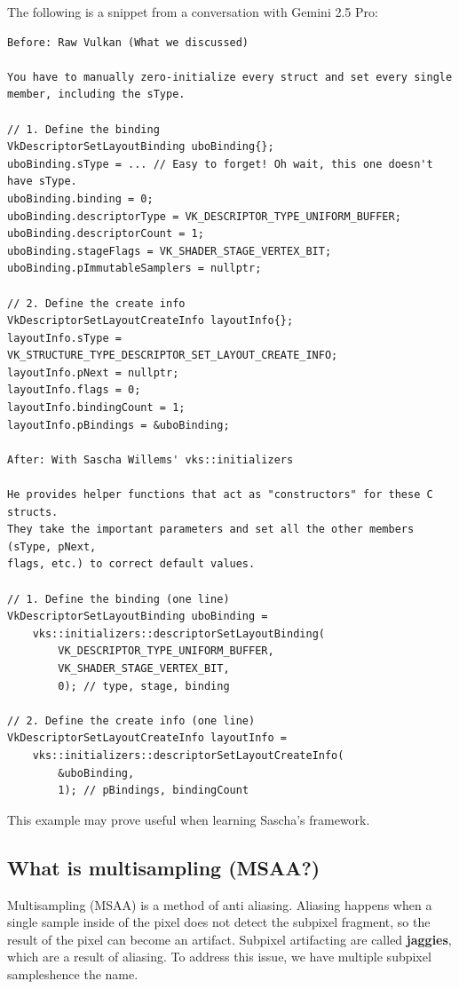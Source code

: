 \documentclass{article}
\begin{document}
\par The following is a snippet from a conversation with Gemini 2.5 Pro:
\begin{verbatim}
Before: Raw Vulkan (What we discussed)

You have to manually zero-initialize every struct and set every single
member, including the sType.

// 1. Define the binding
VkDescriptorSetLayoutBinding uboBinding{};
uboBinding.sType = ... // Easy to forget! Oh wait, this one doesn't have sType.
uboBinding.binding = 0;
uboBinding.descriptorType = VK_DESCRIPTOR_TYPE_UNIFORM_BUFFER;
uboBinding.descriptorCount = 1;
uboBinding.stageFlags = VK_SHADER_STAGE_VERTEX_BIT;
uboBinding.pImmutableSamplers = nullptr;

// 2. Define the create info
VkDescriptorSetLayoutCreateInfo layoutInfo{};
layoutInfo.sType = VK_STRUCTURE_TYPE_DESCRIPTOR_SET_LAYOUT_CREATE_INFO;
layoutInfo.pNext = nullptr;
layoutInfo.flags = 0;
layoutInfo.bindingCount = 1;
layoutInfo.pBindings = &uboBinding;

After: With Sascha Willems' vks::initializers

He provides helper functions that act as "constructors" for these C structs.
They take the important parameters and set all the other members (sType, pNext,
flags, etc.) to correct default values.

// 1. Define the binding (one line)
VkDescriptorSetLayoutBinding uboBinding =
    vks::initializers::descriptorSetLayoutBinding(
        VK_DESCRIPTOR_TYPE_UNIFORM_BUFFER,
        VK_SHADER_STAGE_VERTEX_BIT,
        0); // type, stage, binding

// 2. Define the create info (one line)
VkDescriptorSetLayoutCreateInfo layoutInfo =
    vks::initializers::descriptorSetLayoutCreateInfo(
        &uboBinding,
        1); // pBindings, bindingCount
\end{verbatim}
This example may prove useful when learning Sascha's framework.

\subsection*{What is multisampling (MSAA?)}
\par Multisampling (MSAA) is a method of anti aliasing. Aliasing happens
when a single sample inside of the pixel does not detect the
sub\-pixel fragment, so the result of the pixel can become an
artifact. Sub\-pixel artifacting are called \textbf{jaggies}, which
are a result of aliasing. To address this issue, we have multiple
sub\-pixel samples\textemdash hence the name.
\end{document}
